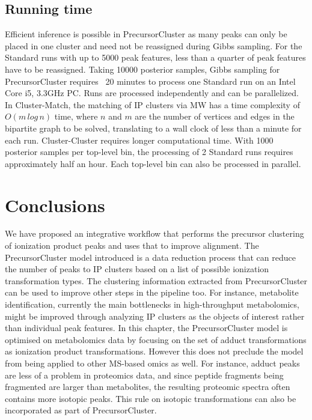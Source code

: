 \subsection{Running time\label{sub:precursor-running-time}}

Efficient inference is possible in PrecursorCluster as many peaks can only be placed in one cluster and need not be reassigned during Gibbs sampling. For the Standard runs with up to 5000 peak features, less than a quarter of peak features have to be reassigned. Taking 10000 posterior samples, Gibbs sampling for PrecursorCluster requires ~20 minutes to process one Standard run on an Intel Core i5, 3.3GHz PC. Runs are processed independently and can be parallelized. In Cluster-Match, the matching of IP clusters via MW has a time complexity of $O(m\, log\, n)$ time, where $n$ and $m$ are the number of vertices and edges in the bipartite graph to be solved, translating to a wall clock of less than a minute for each run. Cluster-Cluster requires longer computational time. With 1000 posterior samples per top-level bin, the processing of 2 Standard runs requires approximately half an hour. Each top-level bin can also be processed in parallel.

\section{Conclusions}

We have proposed an integrative workflow that performs the precursor clustering of ionization product peaks and uses that to improve alignment. The PrecursorCluster model introduced is a data reduction process that can reduce the number of peaks to IP clusters based on a list of possible ionization transformation types. The clustering information extracted from PrecursorCluster can be used to improve other steps in the pipeline too. For instance, metabolite identification, currently the main bottlenecks in high-throughput metabolomics, might be improved through analyzing IP clusters as the objects of interest rather than individual peak features. In this chapter, the PrecursorCluster model is optimised on metabolomics data by focusing on the set of adduct transformations as ionization product transformations. However this does not preclude the model from being applied to other MS-based omics as well. For instance, adduct peaks are less of a problem in proteomics data, and since peptide fragments being fragmented are larger than metabolites, the resulting proteomic spectra often contains more isotopic peaks. This rule on isotopic transformations can also be incorporated as part of PrecursorCluster. 

